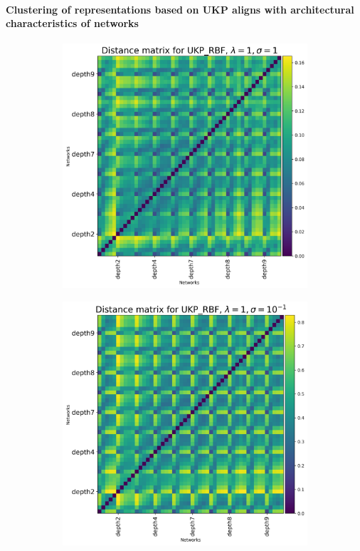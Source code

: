 \documentclass[11pt]{article}
\theoremstyle{plain}
\begin{document}
\paragraph{Clustering of representations based on UKP aligns with architectural characteristics of networks}

\begin{figure}[!h]
    \centering
    \begin{subfigure}[b]{0.3\textwidth}
        \includegraphics[width=\textwidth]{Appendix figures/mnist_experiments/Heatmaps/Heatmap for UKP_dist_RBF_1.000000e+00_1.000000e+00.png}
    \end{subfigure}
    \hfill
    \begin{subfigure}[b]{0.3\textwidth}
        \includegraphics[width=\textwidth]{Appendix figures/mnist_experiments/Heatmaps/Heatmap for UKP_dist_RBF_1.000000e+00_1.000000e-01.png}

\end{subfigure}
\end{figure}
\end{document}
